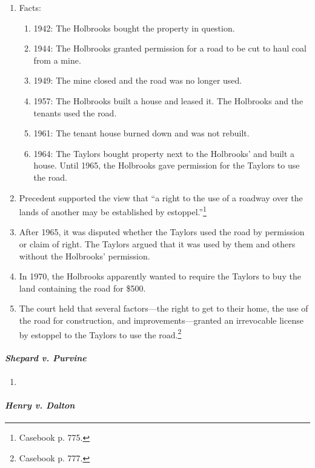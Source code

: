 \begin{enumerate}
    \item Facts:
    \begin{enumerate}
        \item 1942: The Holbrooks bought the property in question.
        \item 1944: The Holbrooks granted permission for a road to be cut to 
        haul coal from a mine.
        \item 1949: The mine closed and the road was no longer used.
        \item 1957: The Holbrooks built a house and leased it. The Holbrooks 
        and the tenants used the road.
        \item 1961: The tenant house burned down and was not rebuilt.
        \item 1964: The Taylors bought property next to the Holbrooks' and 
        built a house. Until 1965, the Holbrooks gave permission for the 
        Taylors to use the road.
    \end{enumerate}
    \item Precedent supported the view that ``a right to the use of a roadway 
    over the lands of another may be established by 
    estoppel.''\footnote{Casebook p. 775.}
    \item After 1965, it was disputed whether the Taylors used the road by 
    permission or claim of right. The Taylors argued that it was used by them 
    and others without the Holbrooks' permission.
    \item In 1970, the Holbrooks apparently wanted to require the Taylors to 
    buy the land containing the road for \$500.
    \item The court held that several factors---the right to get to their 
    home, the use of the road for construction, and improvements---granted an 
    irrevocable license by estoppel to the Taylors to use the 
    road.\footnote{Casebook p. 777.}
\end{enumerate}

\paragraph{\emph{Shepard v. Purvine}}

\begin{enumerate}
    \item %
\end{enumerate}

\paragraph{\emph{Henry v. Dalton}}

